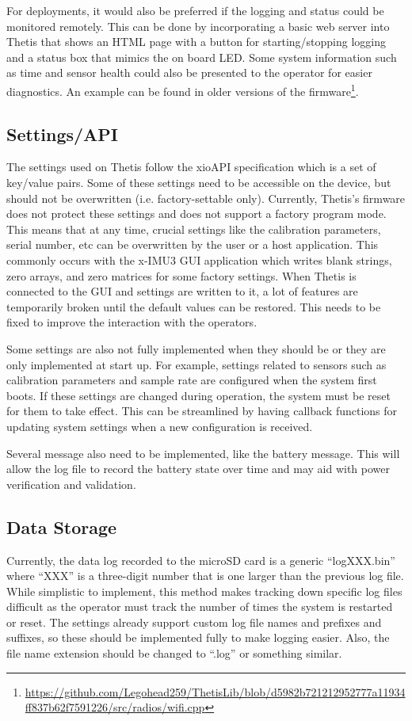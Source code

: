 For deployments, it would also be preferred if the logging and status could be monitored remotely.
This can be done by incorporating a basic web server into Thetis that shows an HTML page with a button for starting/stopping logging and a status box that mimics the on board LED.
Some system information such as time and sensor health could also be presented to the operator for easier diagnostics.
An example can be found in older versions of the firmware\footnote{\url{https://github.com/Legohead259/ThetisLib/blob/d5982b721212952777a11934ff837b62f7591226/src/radios/wifi.cpp}}.

\subsection{Settings/API} 
The settings used on Thetis follow the xioAPI specification which is a set of key/value pairs.
Some of these settings need to be accessible on the device, but should not be overwritten (i.e. factory-settable only).
Currently, Thetis's firmware does not protect these settings and does not support a factory program mode.
This means that at any time, crucial settings like the calibration parameters, serial number, etc can be overwritten by the user or a host application.
This commonly occurs with the x-IMU3 GUI application which writes blank strings, zero arrays, and zero matrices for some factory settings.
When Thetis is connected to the GUI and settings are written to it, a lot of features are temporarily broken until the default values can be restored.
This needs to be fixed to improve the interaction with the operators.

Some settings are also not fully implemented when they should be or they are only implemented at start up.
For example, settings related to sensors such as calibration parameters and sample rate are configured when the system first boots.
If these settings are changed during operation, the system must be reset for them to take effect.
This can be streamlined by having callback functions for updating system settings when a new configuration is received.

Several message also need to be implemented, like the battery message.
This will allow the log file to record the battery state over time and may aid with power verification and validation.

\subsection{Data Storage} 
Currently, the data log recorded to the microSD card is a generic ``logXXX.bin'' where ``XXX'' is a three-digit number that is one larger than the previous log file.
While simplistic to implement, this method makes tracking down specific log files difficult as the operator must track the number of times the system is restarted or reset.
The settings already support custom log file names and prefixes and suffixes, so these should be implemented fully to make logging easier.
Also, the file name extension should be changed to ``.log'' or something similar.

